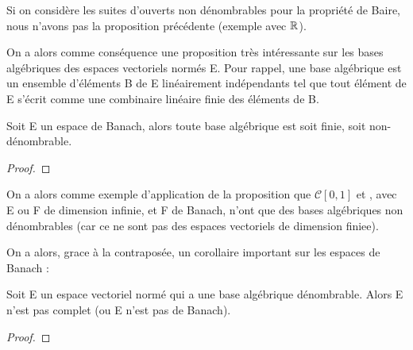\begin{remarque}
	Si on considère les suites d'ouverts non dénombrables pour la propriété de
	Baire, nous n'avons pas la proposition précédente (exemple avec $\mathbb{R}$).
\end{remarque}

On a alors comme conséquence une proposition très intéressante sur les bases
algébriques des espaces vectoriels normés E. Pour rappel, une base algébrique
est un ensemble d'éléments B de E linéairement indépendants tel que tout élément
de E s'écrit comme une combinaire linéaire finie des éléments de B.

\begin{proposition}
	Soit E un espace de Banach, alors toute base algébrique est soit finie, soit
	non-dénombrable.
\end{proposition}

\begin{proof}
	
\end{proof}

On a alors comme exemple d'application de la proposition que $\mathcal{C}[0, 1]$
et , avec E ou F de dimension infinie, et F de Banach,
n'ont que des bases algébriques non dénombrables (car ce ne sont pas des espaces
vectoriels de dimension finiee).

On a alors, grace à la contraposée, un corollaire important sur les espaces de
Banach :

\begin{corollary}
	Soit E un espace vectoriel normé qui a une base algébrique dénombrable.
	Alors E n'est pas complet (ou E n'est pas de Banach).
\end{corollary}

\begin{proof}
	
\end{proof}
